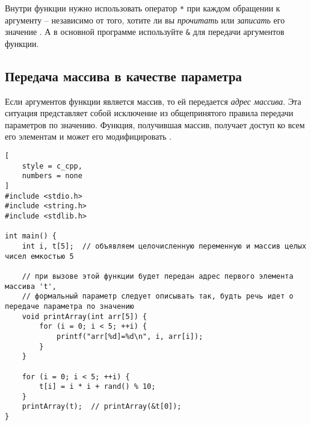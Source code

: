 \documentclass[%
	11pt,
	a4paper,
	utf8,
		]{article}
\begin{document}
Внутри функции нужно использовать оператор \verb|*| при каждом обращении к аргументу -- независимо от того, хотите ли вы \emph{прочитать} или \emph{записать} его значение \cite[]{koltzov-c-lang:2019}. А в основной программе используйте \verb|&| для передачи аргументов функции.

\subsection{Передача массива в качестве параметра}

Если аргументов функции является массив, то ей передается \emph{адрес массива}. Эта ситуация представляет собой исключение из общепринятого правила передачи параметров по значению. Функция, получившая массив, получает доступ ко всем его элементам и может его модифицировать \cite[]{koltzov-c-lang:2019}.

\begin{lstlisting}[
    style = c_cpp,
    numbers = none
]
#include <stdio.h>
#include <string.h>
#include <stdlib.h>

int main() {
	int i, t[5];  // объявляем целочисленную переменную и массив целых чисел емкостью 5
	
	// при вызове этой функции будет передан адрес первого элемента массива 't',
	// формальный параметр следует описывать так, будть речь идет о передаче параметра по значению
	void printArray(int arr[5]) {
		for (i = 0; i < 5; ++i) {
			printf("arr[%d]=%d\n", i, arr[i]);
		}
	}
	
	for (i = 0; i < 5; ++i) {
		t[i] = i * i + rand() % 10;
	}
	printArray(t);  // printArray(&t[0]);
}
\end{lstlisting}




\begin{thebibliography}{99}
\end{thebibliography}


\lstlistoflistings{}
\end{document}
